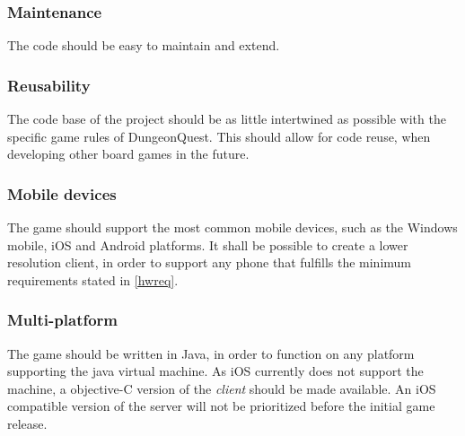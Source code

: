\subsubsection{Maintenance}
The code should be easy to maintain and extend.



\subsubsection{Reusability}
The code base of the project should be as little intertwined as possible with the specific game rules of DungeonQuest. This should allow for code reuse, when developing other board games in the future.



\subsubsection{Mobile devices}
The game should support the most common mobile devices, such as the Windows mobile, iOS and Android platforms. It shall be possible to create a lower resolution client, in order to support any phone that fulfills the minimum requirements stated in \ref{hwreq}.


\subsubsection{Multi-platform}
The game should be written in Java, in order to function on any platform supporting the java virtual machine. As iOS currently does not support the machine, a objective-C version of the \emph{client} should be made available. An iOS compatible version of the server will not be prioritized before the initial game release.


